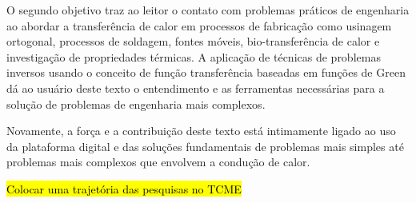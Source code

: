\documentclass[a4paper,12pt,fleqn,twoside]{book}
\begin{document}
	O segundo objetivo traz ao leitor o contato com problemas práticos de engenharia ao abordar a transferência de calor em processos de fabricação como usinagem ortogonal, processos de soldagem, fontes móveis, bio-transferência de calor e investigação de propriedades térmicas. A aplicação de técnicas de problemas inversos usando o conceito de função transferência baseadas em funções de Green dá ao usuário deste texto o entendimento e as ferramentas necessárias para a solução de problemas de engenharia mais complexos.

	Novamente, a força e a contribuição deste texto está intimamente ligado ao uso da plataforma digital e das soluções fundamentais de problemas mais simples até problemas mais complexos que envolvem a condução de calor.
	
	\hl{Colocar uma trajetória das pesquisas no TCME}
\end{document}
